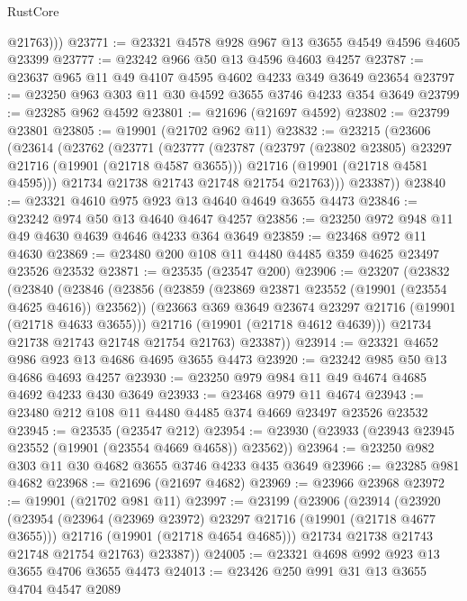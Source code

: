 \begin{lexlean}{RustCore}
\begin{coremodule}
          @21763)))
@23771 := @23321 @4578 @928 @967 @13 @3655 @4549 @4596 @4605 @23399
@23777 := @23242 @966 @50 @13 @4596 @4603 @4257
@23787 := @23637 @965 @11 @49 @4107 @4595 @4602 @4233 @349 @3649 @23654
@23797 := @23250 @963 @303 @11 @30 @4592 @3655 @3746 @4233 @354 @3649
@23799 := @23285 @962 @4592
@23801 := @21696 (@21697 @4592)
@23802 := @23799 @23801
@23805 := @19901 (@21702 @962 @11)
@23832 := @23215
    (@23606
      (@23614
        (@23762
          (@23771
            (@23777
              (@23787
                (@23797 (@23802 @23805) @23297 @21716 (@19901 (@21718 @4587 @3655)))
                @21716
                (@19901 (@21718 @4581 @4595)))
              @21734
              @21738
              @21743
              @21748
              @21754
              @21763)))
        @23387))
@23840 := @23321 @4610 @975 @923 @13 @4640 @4649 @3655 @4473
@23846 := @23242 @974 @50 @13 @4640 @4647 @4257
@23856 := @23250 @972 @948 @11 @49 @4630 @4639 @4646 @4233 @364 @3649
@23859 := @23468 @972 @11 @4630
@23869 := @23480 @200 @108 @11 @4480 @4485 @359 @4625 @23497 @23526 @23532
@23871 := @23535 (@23547 @200)
@23906 := @23207
    (@23832
      (@23840
        (@23846
          (@23856
            (@23859 (@23869 @23871 @23552 (@19901 (@23554 @4625 @4616)) @23562))
            (@23663 @369 @3649 @23674 @23297 @21716 (@19901 (@21718 @4633 @3655)))
            @21716
            (@19901 (@21718 @4612 @4639)))
          @21734
          @21738
          @21743
          @21748
          @21754
          @21763)
        @23387))
@23914 := @23321 @4652 @986 @923 @13 @4686 @4695 @3655 @4473
@23920 := @23242 @985 @50 @13 @4686 @4693 @4257
@23930 := @23250 @979 @984 @11 @49 @4674 @4685 @4692 @4233 @430 @3649
@23933 := @23468 @979 @11 @4674
@23943 := @23480 @212 @108 @11 @4480 @4485 @374 @4669 @23497 @23526 @23532
@23945 := @23535 (@23547 @212)
@23954 := @23930 (@23933 (@23943 @23945 @23552 (@19901 (@23554 @4669 @4658)) @23562))
@23964 := @23250 @982 @303 @11 @30 @4682 @3655 @3746 @4233 @435 @3649
@23966 := @23285 @981 @4682
@23968 := @21696 (@21697 @4682)
@23969 := @23966 @23968
@23972 := @19901 (@21702 @981 @11)
@23997 := @23199
    (@23906
      (@23914
        (@23920
          (@23954
            (@23964 (@23969 @23972) @23297 @21716 (@19901 (@21718 @4677 @3655)))
            @21716
            (@19901 (@21718 @4654 @4685)))
          @21734
          @21738
          @21743
          @21748
          @21754
          @21763)
        @23387))
@24005 := @23321 @4698 @992 @923 @13 @3655 @4706 @3655 @4473
@24013 := @23426 @250 @991 @31 @13 @3655 @4704 @4547 @2089

\end{coremodule}
\end{lexlean}
